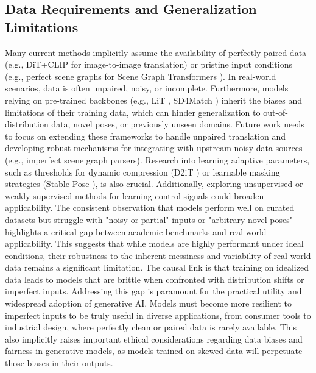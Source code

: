 \documentclass[a4paper]{article}
\begin{document}
\subsection{Data Requirements and Generalization Limitations}
Many current methods implicitly assume the availability of perfectly paired data (e.g., DiT+CLIP \cite{Zhu2025ImageToImage} for image-to-image translation) or pristine input conditions (e.g., perfect scene graphs for Scene Graph Transformers \cite{Sortino2023TransformerSceneGraphs}). In real-world scenarios, data is often unpaired, noisy, or incomplete. Furthermore, models relying on pre-trained backbones (e.g., LiT \cite{Jiang2025LiT}, SD4Match \cite{Li2023SD4Match}) inherit the biases and limitations of their training data, which can hinder generalization to out-of-distribution data, novel poses, or previously unseen domains. Future work needs to focus on extending these frameworks to handle unpaired translation and developing robust mechanisms for integrating with upstream noisy data sources (e.g., imperfect scene graph parsers). Research into learning adaptive parameters, such as thresholds for dynamic compression (D2iT \cite{Jia2025D2iT}) or learnable masking strategies (Stable-Pose \cite{Wang2024StablePose}), is also crucial. Additionally, exploring unsupervised or weakly-supervised methods for learning control signals could broaden applicability. The consistent observation that models perform well on curated datasets but struggle with "noisy or partial" inputs or "arbitrary novel poses" highlights a critical gap between academic benchmarks and real-world applicability. This suggests that while models are highly performant under ideal conditions, their robustness to the inherent messiness and variability of real-world data remains a significant limitation. The causal link is that training on idealized data leads to models that are brittle when confronted with distribution shifts or imperfect inputs. Addressing this gap is paramount for the practical utility and widespread adoption of generative AI. Models must become more resilient to imperfect inputs to be truly useful in diverse applications, from consumer tools to industrial design, where perfectly clean or paired data is rarely available. This also implicitly raises important ethical considerations regarding data biases and fairness in generative models, as models trained on skewed data will perpetuate those biases in their outputs.
\end{document}
